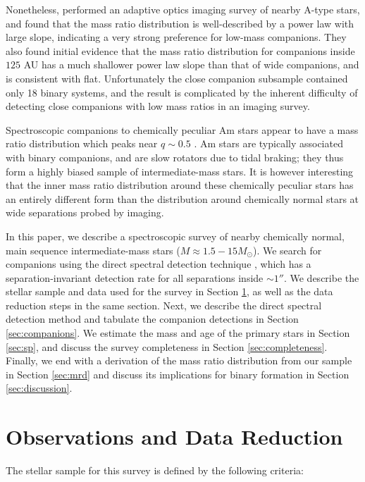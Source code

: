 \documentclass{emulateapj}
\begin{document}
Nonetheless, \citet{DeRosa2014} performed an adaptive optics imaging survey of nearby A-type stars, and found that the mass ratio distribution is well-described by a power law with large slope, indicating a very strong preference for low-mass companions. They also found initial evidence that the mass ratio distribution for companions inside $125$ AU has a much shallower power law slope than that of wide companions, and is consistent with flat. Unfortunately the close companion subsample contained only 18 binary systems, and the result is complicated by the inherent difficulty of detecting close companions with low mass ratios in an imaging survey. 

Spectroscopic companions to chemically peculiar Am stars appear to have a mass ratio distribution which peaks near $q \sim 0.5$ \citep{Vuissoz2004}. Am stars are typically associated with binary companions, and are slow rotators due to tidal braking; they thus form a highly biased sample of intermediate-mass stars. It is however interesting that the inner mass ratio distribution around these chemically peculiar stars has an entirely different form than the distribution around chemically normal stars at wide separations probed by imaging.

In this paper, we describe a spectroscopic survey of nearby chemically normal, main sequence intermediate-mass stars ($M \approx 1.5 - 15 M_{\odot}$). We search for companions using the direct spectral detection technique \citep{Gullikson2016}, which has a separation-invariant detection rate for all separations inside $\sim 1 ''$. We describe the stellar sample and data used for the survey in Section \ref{sec:obs}, as well as the data reduction steps in the same section. Next, we describe the direct spectral detection method and tabulate the companion detections in Section \ref{sec:companions}. We estimate the mass and age of the primary stars in Section \ref{sec:sp}, and discuss the survey completeness in Section \ref{sec:completeness}. Finally, we end with a derivation of the mass ratio distribution from our sample in Section \ref{sec:mrd} and discuss its implications for binary formation in Section \ref{sec:discussion}.
 


\section{Observations and Data Reduction}
\label{sec:obs}

The stellar sample for this survey is defined by the following criteria:
\end{document}
